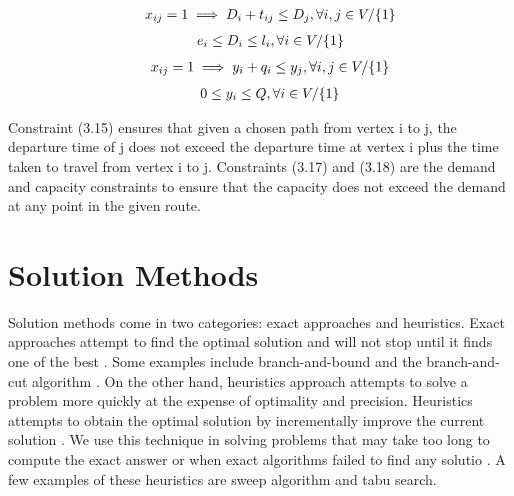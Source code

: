 \begin{equation}
    \begin{array}{ll@{}ll@{}ll}
        & x_{ij} = 1 \implies D_{i} + t_{ij} \leq D_{j}, \forall i, j \in V / \{1\}
    \end{array}
\end{equation}
\begin{equation}
    \begin{array}{ll@{}ll@{}ll}
        & e_{i} \leq D_{i} \leq l_{i}, \forall i \in V / \{1\}
    \end{array}
\end{equation}
\begin{equation}
    \begin{array}{ll@{}ll@{}ll}
        & x_{ij} = 1 \implies y_{i} + q_{i} \leq y_{j}, \forall i, j \in V / \{1\}
    \end{array}
\end{equation}
\begin{equation}
    \begin{array}{ll@{}ll@{}ll}
        & 0 \leq y_{i} \leq Q, \forall i \in V / \{1\}
    \end{array}
\end{equation}

\vspace{1cm}

Constraint (3.15) ensures that given a chosen path from vertex i to j, the departure time of j does not exceed the
departure time at vertex i plus the time taken to travel from vertex i to j. Constraints (3.17) and (3.18) are the
demand and capacity constraints to ensure that the capacity does not exceed the demand at any point in the given route.

\section{Solution Methods}
Solution methods come in two categories: exact approaches and heuristics. Exact approaches attempt
to find the optimal solution and will not stop until it finds one of the best \cite{neo:exact}. Some examples
include branch-and-bound and the branch-and-cut algorithm \cite{here, ILPCoursera}. On the other hand, heuristics approach
 attempts to solve a problem more quickly at the expense of optimality and precision. Heuristics attempts to obtain the optimal solution by incrementally improve
 the current solution \cite{Laporte1999}. We use this technique in
solving problems that may take too long to compute the exact answer or when exact algorithms failed to find any solutio \cite{here}.
A few examples of these heuristics are sweep algorithm and tabu search.

